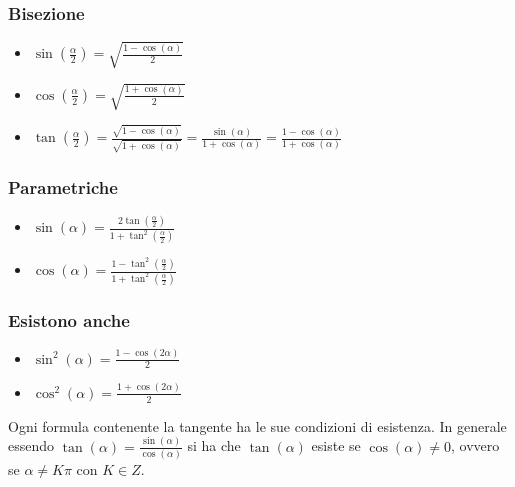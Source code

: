 \subsubsection*{Bisezione}

\begin{itemize}
    \item $\sin(\frac{\alpha}{2})=\sqrt{\frac{1-\cos(\alpha)}{2}}$
    \item $\cos(\frac{\alpha}{2})=\sqrt{\frac{1+\cos(\alpha)}{2}}$
    \item $\tan(\frac{\alpha}{2})=\frac{\sqrt{1-\cos(\alpha)}}{\sqrt{1+\cos(\alpha)}}=\frac{\sin(\alpha)}{1+\cos(\alpha)}=\frac{1-\cos(\alpha)}{1+\cos(\alpha)}$
\end{itemize}

\subsubsection*{Parametriche}

\begin{itemize}
    \item $\sin(\alpha)=\frac{2\tan(\frac{\alpha}{2})}{1+\tan^2(\frac{\alpha}{2})}$
    \item $\cos(\alpha)=\frac{1-\tan^2(\frac{\alpha}{2})}{1+\tan^2(\frac{\alpha}{2})}$
\end{itemize}

\subsubsection*{Esistono anche}

\begin{itemize}
    \item $\sin^2(\alpha)=\frac{1-\cos(2\alpha)}{2}$
    \item $\cos^2(\alpha)=\frac{1+\cos(2\alpha)}{2}$
\end{itemize}

Ogni formula contenente la tangente ha le sue condizioni di esistenza.
In generale essendo $\tan(\alpha)=\frac{\sin(\alpha)}{\cos(\alpha)}$ si ha che $\tan(\alpha)$ esiste se $\cos(\alpha)\neq0$, ovvero se $\alpha\neq K\pi$ con $K \in Z$.
